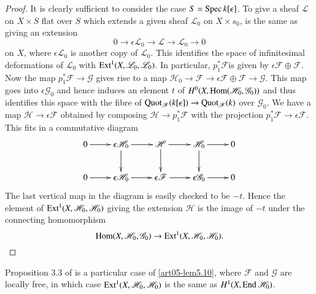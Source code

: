 \begin{proof}
It is clearly sufficient to consider the case $S=\operatorname{Spec}
k[\epsilon]$. To give a sheaf $\mathscr{L}$ on $X\times S$ flat over
$S$ which extends a given sheaf $\mathscr{L}_{0}$ on $X\times s_{0}$,
is the same as giving an extension
$$
0\to \epsilon \mathscr{L}_{0}\to \mathscr{L}\to \mathscr{L}_{0}\to 0
$$
on $X$, where $\epsilon \mathscr{L}_{0}$ is another copy of
$\mathscr{L}_{0}$. This identifies the space of infinitesimal
deformations of $\mathscr{L}_{0}$ with
$\operatorname{Ext}^{1}(X,\mathscr{L}_{0},\mathscr{L}_{0})$. In particular,
$p^{*}_{1}\mathscr{F}$\pageoriginale is given by
$\epsilon \mathscr{F}\oplus \mathscr{F}$. Now the map
$p^{*}_{1}\mathscr{F}\to \mathscr{G}$ gives rise to a map
$\mathscr{H}_{0}\to \mathscr{F}\to \epsilon \mathscr{F}\oplus \mathscr{F}\to \mathscr{G}$. This
map goes into $\epsilon \mathscr{G}_{0}$ and hence induces an element
$t$ of $H^{0}(X,\operatorname{Hom}(\mathscr{H}_{0},\mathscr{G}_{0}))$ and thus
identifies this space with the fibre of
$\operatorname{Quot}_{\mathscr{F}}(k[\epsilon])\to \operatorname{Quot}_{\mathscr{F}}(k)$ over
$\mathscr{G}_{0}$. We have a map $\mathscr{H}\to \epsilon \mathscr{F}$
obtained by composing $\mathscr{H}\to p^{*}_{1}\mathscr{F}$ with the
projection $p^{*}_{1}\mathscr{F}\to \epsilon \mathscr{F}$. This fits
in a commutative diagram 
\[
\xymatrix{
0\ar[r] & \epsilon \mathscr{H}_{0}\ar[d]\ar[r]
& \mathscr{H}\ar[d]\ar[r] & \mathscr{H}_{0}\ar[d]\ar[r] & 0\\
0\ar[r] & \epsilon \mathscr{H}_{0}\ar[r] & \epsilon \mathscr{F}\ar[r]
& \epsilon\mathscr{G}_{0}\ar[r] & 0
}
\]
The last vertical map in the diagram is easily checked to be
$-t$. Hence the element of
$\operatorname{Ext}^{1}(X,\mathscr{H}_{0},\mathscr{H}_{0})$ giving the extension
$\mathscr{H}$ is the image of $-t$ under the connecting homomorphism
$$
\operatorname{Hom}(X,\mathscr{H}_{0},\mathscr{G}_{0})\to \operatorname{Ext}^{1}(X,\mathscr{H}_{0},\mathscr{H}_{0}).
$$ 
\end{proof}

\begin{remark}\label{art05-rem5.11}
Proposition 3.3 of \cite{art05-key5} is a particular case
of \ref{art05-lem5.10}, where $\mathscr{F}$ and $\mathscr{G}$ are
locally free, in which case
$\operatorname{Ext}^{1}(X,\mathscr{H}_{0},\mathscr{H}_{0})$ is the same as
$H^{1}(X,\operatorname{End} \mathscr{H}_{0})$.
\end{remark}

